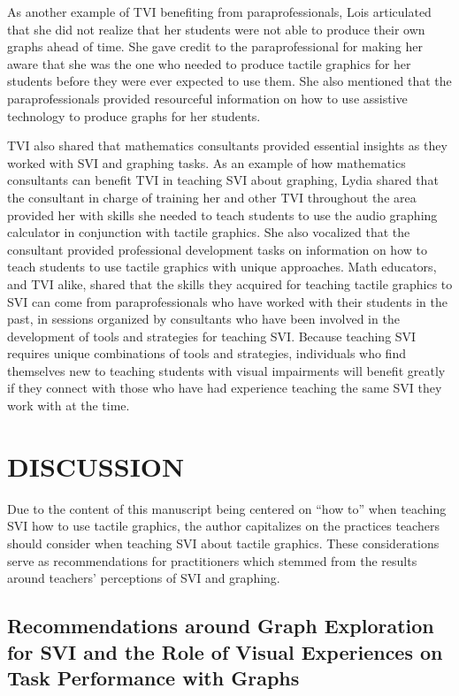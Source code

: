 \documentclass[11.5pt]{sig-alternate} %
\begin{document}
\begin{large}
As another example of TVI benefiting from paraprofessionals, Lois articulated that she did not realize that her students were not able to produce their own graphs ahead of time. She gave credit to the paraprofessional for making her aware that she was the one who needed to produce tactile graphics for her students before they were ever expected to use them. She also mentioned that the paraprofessionals provided resourceful information on how to use assistive technology to produce graphs for her students.
 
TVI also shared that mathematics consultants provided essential insights as they worked with SVI and graphing tasks. As an example of how mathematics consultants can benefit TVI in teaching SVI about graphing, Lydia shared that the consultant in charge of training her and other TVI throughout the area provided her with skills she needed to teach students to use the audio graphing calculator in conjunction with tactile graphics. She also vocalized that the consultant provided professional development tasks on information on how to teach students to use tactile graphics with unique approaches. Math educators, and TVI alike, shared that the skills they acquired for teaching tactile graphics to SVI can come from paraprofessionals who have worked with their students in the past, in sessions organized by consultants who have been involved in the development of tools and strategies for teaching SVI. Because teaching SVI requires unique combinations of tools and strategies, individuals who find themselves new to teaching students with visual impairments will benefit greatly if they connect with those who have had experience teaching the same SVI they work with at the time.
 
\section*{DISCUSSION}

Due to the content of this manuscript being centered on “how to” when teaching SVI how to use tactile graphics, the author capitalizes on the practices teachers should consider when teaching SVI about tactile graphics. These considerations serve as recommendations for practitioners which stemmed from the results around teachers’ perceptions of SVI and graphing.
 
\subsection*{Recommendations around Graph Exploration for SVI and the Role of Visual Experiences on Task Performance with Graphs}


\end{large}
\end{document}
